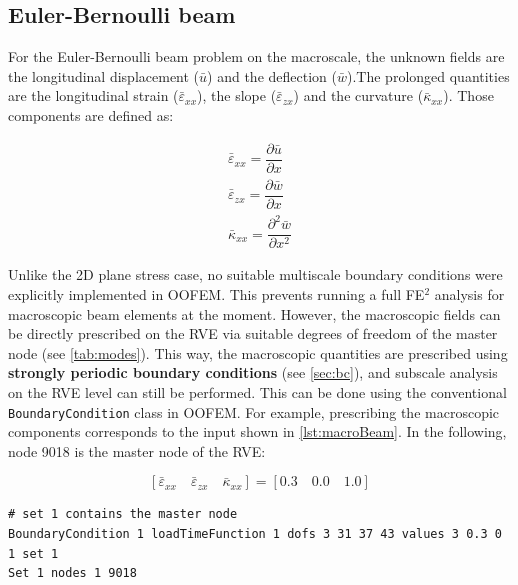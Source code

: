 \documentclass[11pt]{article}
\begin{document}
\subsection{Euler-Bernoulli beam}

For the Euler-Bernoulli beam problem on the macroscale, the unknown fields are the longitudinal displacement ($\bar{u}$) and the deflection ($\bar{w}$).The prolonged quantities are the longitudinal strain ($\bar{\varepsilon}_{xx}$), the slope ($\bar{\varepsilon}_{zx}$) and the curvature ($\bar{\kappa}_{xx}$). Those components are defined as:

\begin{eqnarray}
    \bar{\varepsilon}_{xx} = \dfrac{\partial \bar{u}}{\partial x} \\
    \bar{\varepsilon}_{zx} = \dfrac{\partial \bar{w}}{\partial x} \\
    \bar{\kappa}_{xx} = \dfrac{\partial^2 \bar{w}}{\partial x^2}
\end{eqnarray}

\noindent Unlike the 2D plane stress case, no suitable multiscale boundary conditions were explicitly implemented in OOFEM. This prevents running a full FE$^2$ analysis for macroscopic beam elements at the moment. 
However, the macroscopic fields can be directly prescribed on the RVE via suitable degrees of freedom of the master node (see \cref{tab:modes}). 
This way, the macroscopic quantities are prescribed using \textbf{strongly periodic boundary conditions} (see \cref{sec:bc}), and subscale analysis on the RVE level can still be performed. 
This can be done using the conventional \texttt{BoundaryCondition} class in OOFEM. For example, prescribing the macroscopic components corresponds to the input shown in \cref{lst:macroBeam}. In the following, node 9018 is the master node of the RVE:

\begin{equation*}
    \left[ \bar{\varepsilon}_{xx} \quad \bar{\varepsilon}_{zx} \quad \bar{\kappa}_{xx} \right] = \left[ 0.3 \quad 0.0 \quad 1.0 \right]
\end{equation*}

\begin{lstlisting}[style=oofem,language=oofeminput, caption={OOFEM input format in case of an Euler-Bernoulli problem at macroscale.}, label=lst:macroBeam]
# set 1 contains the master node
BoundaryCondition 1 loadTimeFunction 1 dofs 3 31 37 43 values 3 0.3 0 1 set 1
Set 1 nodes 1 9018
\end{lstlisting}
\end{document}
